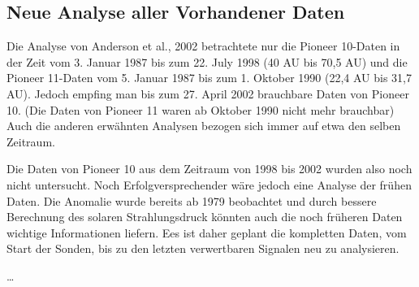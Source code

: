\subsection{Neue Analyse aller Vorhandener Daten}
Die Analyse von Anderson et al., 2002 betrachtete nur die Pioneer 10-Daten in der Zeit vom 3. Januar 1987 bis zum 22.
July 1998 (40 AU bis 70,5 AU) und die Pioneer 11-Daten vom 5. Januar 1987 bis zum 1. Oktober 1990 (22,4 AU bis 31,7
AU). Jedoch empfing man bis zum 27. April 2002 brauchbare Daten von Pioneer 10. (Die Daten von Pioneer 11 waren ab
Oktober 1990 nicht mehr brauchbar) Auch die anderen erwähnten Analysen bezogen sich immer auf etwa den selben Zeitraum.

Die Daten von Pioneer 10 aus dem Zeitraum von 1998 bis 2002 wurden also noch nicht untersucht. Noch
Erfolgversprechender wäre jedoch eine Analyse der frühen Daten. Die Anomalie wurde bereits ab 1979 beobachtet und durch
bessere Berechnung des solaren Strahlungsdruck könnten auch die noch früheren Daten wichtige Informationen liefern. Ees
ist daher geplant die kompletten Daten, vom Start der Sonden, bis zu den letzten verwertbaren Signalen neu zu
analysieren.



\bigskip
…
\bigskip

